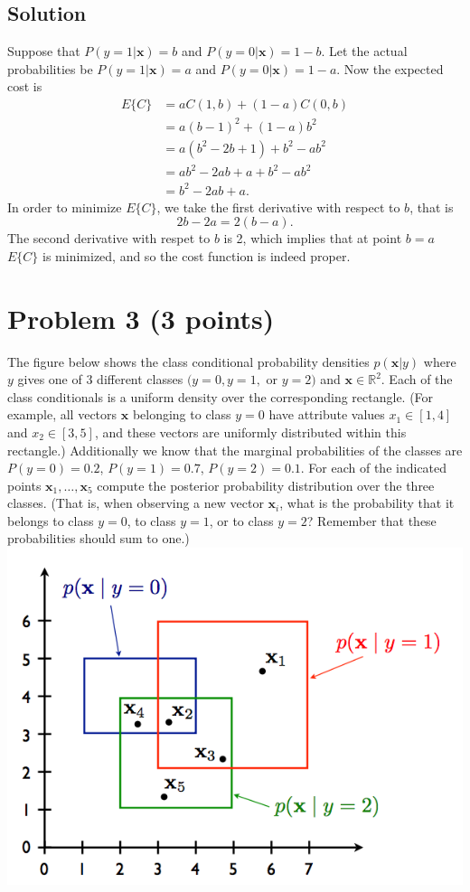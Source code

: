 \documentclass[10pt]{article}
\begin{document}
\subsection*{Solution}
Suppose that $P(y = 1 | \mathbf{x}) = b$ and $P(y = 0 | \mathbf{x}) = 1 - b$. Let the actual probabilities be $P(y = 1|\mathbf{x}) = a$ and $P(y = 0 | \mathbf{x}) = 1 - a$. Now the expected cost is 
\begin{align*}
E\{C\} &= aC(1, b) + (1 - a)C(0, b) \\
       &= a(b - 1)^2 + (1 - a)b^2 \\
       &= a(b^2 - 2b + 1) + b^2 - ab^2 \\
       &= ab^2 - 2ab + a + b^2 - ab^2 \\
       &= b^2 - 2ab + a.
\end{align*}
In order to minimize $E\{C\}$, we take the first derivative with respect to $b$, that is
\[
2b - 2a = 2(b - a).
\]
The second derivative with respet to $b$ is 2, which implies that at point $b = a$ $E\{C\}$ is minimized, and so the cost function is indeed proper.
\section*{Problem 3 (3 points)}
\color{blue}
The figure below shows the class conditional probability densities $p(\mathbf{x} | y)$ where $y$ gives one of 3 different classes $(y = 0, y = 1,$ or $y = 2)$ and $\mathbf{x} \in \mathbb{R}^2$. Each of the class conditionals is a uniform density over the corresponding rectangle. (For example, all vectors $\mathbf{x}$ belonging to class $y = 0$ have attribute values $x_1 \in [1, 4]$ and $x_2 \in [3, 5]$, and these vectors are uniformly distributed within this rectangle.) Additionally we know that the marginal probabilities of the classes are $P(y = 0) = 0.2$, $P(y = 1) = 0.7$, $P(y = 2) = 0.1$. For each of the indicated points $\mathbf{x}_1, \dots, \mathbf{x}_5$ compute the posterior probability distribution over the three classes. (That is, when observing a new vector $\mathbf{x}_i$, what is the probability that it belongs to class $y = 0$, to class $y = 1$, or to class $y = 2$? Remember that these probabilities should sum to one.)
\color{black}
\includegraphics[scale=0.5]{rectangles}
\end{document}
